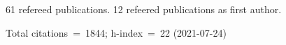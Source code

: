 61 refereed publications. 12 refeered publications as first author.

Total citations~=~1844; h-index~=~22 (2021-07-24)